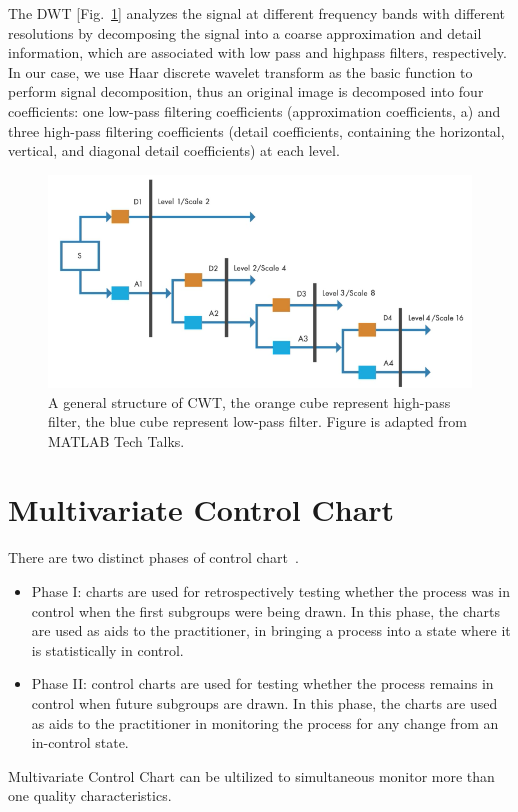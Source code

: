 The DWT [Fig.~\ref{fig:dwt}] analyzes the signal at different frequency bands with different resolutions by decomposing the signal into a coarse approximation and detail information, which are associated with low pass and highpass filters, respectively. In our case, we use Haar discrete wavelet transform as the basic function to perform signal decomposition, thus
an original image is decomposed into four coefficients: one low-pass filtering coefficients (approximation coefficients, a) and three high-pass filtering coefficients (detail
coefficients, containing the horizontal, vertical, and diagonal detail coefficients) at each level.


\begin{figure}[h]
\centering
\includegraphics[width=1\textwidth]{images/dwt.png}
\caption[Structure of CNNs]{A general structure of CWT, the orange cube represent high-pass filter, the blue cube represent low-pass filter. Figure is adapted from MATLAB Tech Talks.}
\label{fig:dwt}
\end{figure}


\section{Multivariate Control Chart}
There are two distinct phases of control chart~\cite{bersimis2007multivariate}.

\begin{itemize}
	\item Phase I: charts are used for retrospectively testing whether the process was in control when the first
subgroups were being drawn. In this phase, the charts are used as aids to the practitioner, in bringing a
process into a state where it is statistically in control.
	\item Phase II: control charts are used for testing whether the process remains in control when future subgroups
are drawn. In this phase, the charts are used as aids to the practitioner in monitoring the process for any
change from an in-control state.
\end{itemize}

Multivariate Control Chart can be ultilized to simultaneous monitor more than one quality characteristics. 




